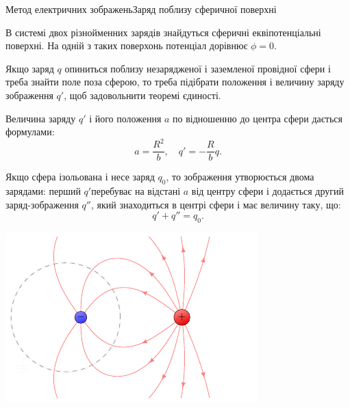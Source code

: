 \documentclass[onlytextwidth]{beamer}
\begin{document}
\begin{frame}{Метод електричних зображень}{Заряд поблизу сферичної поверхні}
	\begin{overprint}
		\begin{block}{}\justifying
			В системі двох різнойменних зарядів знайдуться сферичні еквіпотенціальні поверхні. На
			одній з таких поверхонь потенціал дорівнює $\phi = 0$.
		\end{block}
		\begin{block}{}\justifying
			Якщо заряд $q$ опиниться поблизу \alert{незарядженої} і \alert{заземленої провідної сфери} і
			треба знайти поле поза сферою, то треба підібрати положення і величину заряду зображення $q'$,
			щоб задовольнити теоремі єдиності.
		\end{block}
		\begin{block}{}\justifying
			Величина заряду $q'$ і його положення $a$ по відношенню до центра сфери дається формулами:
			\begin{equation*}
				a = \frac{R^2}{b}, \quad   q' = -\frac{R}{b}q.
			\end{equation*}
		\end{block}
		\begin{block}{}\justifying
			Якщо сфера \alert{ізольована} і \alert{несе заряд $q_0$}, то зображення утворюється
			двома зарядами: перший $q' $перебуває на відстані $a$ від центру сфери і додається
			другий заряд-зображення $q''$, який знаходиться в центрі сфери і має величину таку, що:
			\begin{equation*}
				q' + q'' = q_0.
			\end{equation*}
		\end{block}
	\end{overprint}
	\begin{overprint}
		\onslide<1>
		\begin{center}
			\includegraphics[page=1]{mirrorsphere}

\end{center}
\end{overprint}
\end{frame}
\end{document}
